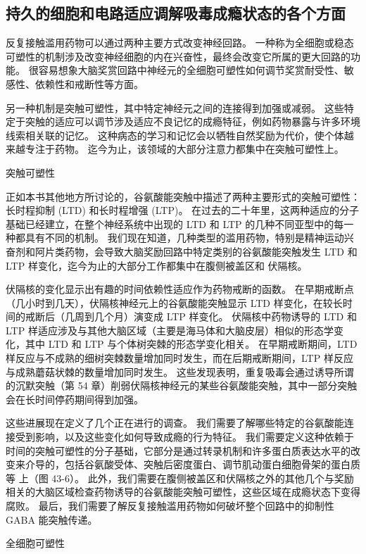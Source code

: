 \subsection{持久的细胞和电路适应调解吸毒成瘾状态的各个方面}

反复接触滥用药物可以通过两种主要方式改变神经回路。 一种称为全细胞或稳态可塑性的机制涉及改变神经细胞的内在兴奋性，最终会改变它所属的更大回路的功能。 很容易想象大脑奖赏回路中神经元的全细胞可塑性如何调节奖赏耐受性、敏感性、依赖性和戒断性等方面。

另一种机制是突触可塑性，其中特定神经元之间的连接得到加强或减弱。 这些特定于突触的适应可以调节涉及适应不良记忆的成瘾特征，例如药物暴露与许多环境线索相关联的记忆。 这种病态的学习和记忆会以牺牲自然奖励为代价，使个体越来越专注于药物。 迄今为止，该领域的大部分注意力都集中在突触可塑性上。

突触可塑性

正如本书其他地方所讨论的，谷氨酸能突触中描述了两种主要形式的突触可塑性：长时程抑制 (LTD) 和长时程增强 (LTP)。 在过去的二十年里，这两种适应的分子基础已经建立，在整个神经系统中出现的 LTD 和 LTP 的几种不同亚型中的每一种都具有不同的机制。 我们现在知道，几种类型的滥用药物，特别是精神运动兴奋剂和阿片类药物，会导致大脑奖励回路中特定类别的谷氨酸能突触发生 LTD 和 LTP 样变化，迄今为止的大部分工作都集中在腹侧被盖区和 伏隔核。

伏隔核的变化显示出有趣的时间依赖性适应作为药物戒断的函数。 在早期戒断点（几小时到几天），伏隔核神经元上的谷氨酸能突触显示 LTD 样变化，在较长时间的戒断后（几周到几个月）演变成 LTP 样变化。 伏隔核中药物诱导的 LTD 和 LTP 样适应涉及与其他大脑区域（主要是海马体和大脑皮层）相似的形态学变化，其中 LTD 和 LTP 与个体树突棘的形态学变化相关。 在早期戒断期间，LTD 样反应与不成熟的细树突棘数量增加同时发生，而在后期戒断期间，LTP 样反应与成熟蘑菇状棘的数量增加同时发生。 这些发现表明，重复吸毒会通过诱导所谓的沉默突触（第 54 章）削弱伏隔核神经元的某些谷氨酸能突触，其中一部分突触会在长时间停药期间得到加强。

这些进展现在定义了几个正在进行的调查。 我们需要了解哪些特定的谷氨酸能连接受到影响，以及这些变化如何导致成瘾的行为特征。 我们需要定义这种依赖于时间的突触可塑性的分子基础，它部分是通过转录机制和许多蛋白质表达水平的改变来介导的，包括谷氨酸受体、突触后密度蛋白、调节肌动蛋白细胞骨架的蛋白质等 上（图 43-6）。 此外，我们需要在腹侧被盖区和伏隔核之外的其他几个与奖励相关的大脑区域检查药物诱导的谷氨酸能突触可塑性，这些区域在成瘾状态下变得腐败。 最后，我们需要了解反复接触滥用药物如何破坏整个回路中的抑制性 GABA 能突触传递。

全细胞可塑性


